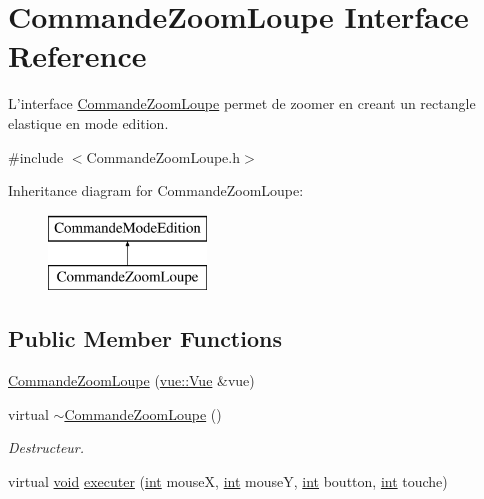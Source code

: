 \hypertarget{class_commande_zoom_loupe}{\section{Commande\-Zoom\-Loupe Interface Reference}
\label{class_commande_zoom_loupe}
}


L'interface \hyperlink{class_commande_zoom_loupe}{Commande\-Zoom\-Loupe} permet de zoomer en creant un rectangle elastique en mode edition.  




{\ttfamily \#include $<$Commande\-Zoom\-Loupe.\-h$>$}

Inheritance diagram for Commande\-Zoom\-Loupe\-:\begin{figure}[H]
\begin{center}
\leavevmode
\includegraphics[height=2.000000cm]{class_commande_zoom_loupe}
\end{center}
\end{figure}
\subsection*{Public Member Functions}
\begin{DoxyCompactItemize}
\item 
\hyperlink{group__inf2990_gaef25c554211f1d059d0e0da604bba314}{Commande\-Zoom\-Loupe} (\hyperlink{classvue_1_1_vue}{vue\-::\-Vue} \&vue)
\item 
virtual \hyperlink{class_commande_zoom_loupe_a4903ef37ed8f806a3cd2b42ee5e41c1a}{$\sim$\-Commande\-Zoom\-Loupe} ()
\begin{DoxyCompactList}\small\item\em Destructeur. \end{DoxyCompactList}\item 
virtual \hyperlink{wglew_8h_aeea6e3dfae3acf232096f57d2d57f084}{void} \hyperlink{group__inf2990_ga803d538d34b6d32dd88def5126d0684b}{executer} (\hyperlink{wglew_8h_a500a82aecba06f4550f6849b8099ca21}{int} mouse\-X, \hyperlink{wglew_8h_a500a82aecba06f4550f6849b8099ca21}{int} mouse\-Y, \hyperlink{wglew_8h_a500a82aecba06f4550f6849b8099ca21}{int} boutton, \hyperlink{wglew_8h_a500a82aecba06f4550f6849b8099ca21}{int} touche)
\end{DoxyCompactItemize}
